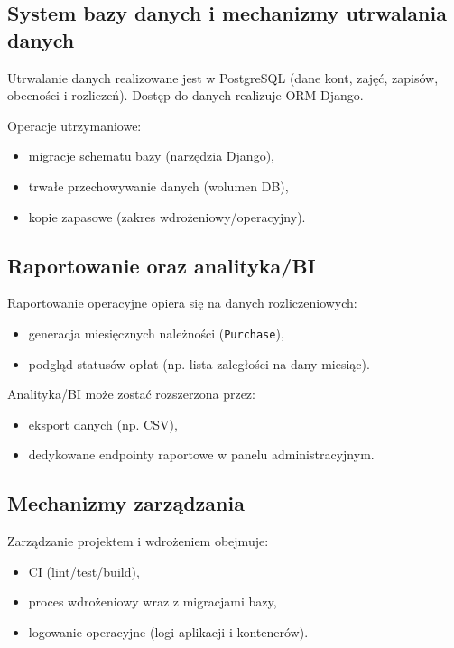 \documentclass{article}
\begin{document}
\subsection{System bazy danych i mechanizmy utrwalania danych}

Utrwalanie danych realizowane jest w PostgreSQL (dane kont, zajęć, zapisów, obecności i rozliczeń).
Dostęp do danych realizuje ORM Django.

Operacje utrzymaniowe:
\begin{itemize}
  \item migracje schematu bazy (narzędzia Django),
  \item trwałe przechowywanie danych (wolumen DB),
  \item kopie zapasowe (zakres wdrożeniowy/operacyjny).
\end{itemize}

\subsection{Raportowanie oraz analityka/BI}

Raportowanie operacyjne opiera się na danych rozliczeniowych:
\begin{itemize}
  \item generacja miesięcznych należności (\texttt{Purchase}),
  \item podgląd statusów opłat (np. lista zaległości na dany miesiąc).
\end{itemize}

Analityka/BI może zostać rozszerzona przez:
\begin{itemize}
  \item eksport danych (np. CSV),
  \item dedykowane endpointy raportowe w panelu administracyjnym.
\end{itemize}

\subsection{Mechanizmy zarządzania}

Zarządzanie projektem i wdrożeniem obejmuje:
\begin{itemize}
  \item CI (lint/test/build),
  \item proces wdrożeniowy wraz z migracjami bazy,
  \item logowanie operacyjne (logi aplikacji i kontenerów).
\end{itemize}
\end{document}
